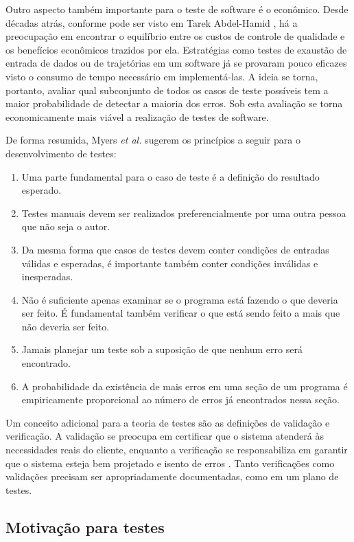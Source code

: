 Outro aspecto também importante para o teste de software é o econômico. Desde décadas atrás, conforme pode ser visto em Tarek Abdel-Hamid \cite{abdel}, há a preocupação em encontrar o equilíbrio entre os custos de controle de qualidade e os benefícios econômicos trazidos por ela. Estratégias como testes de exaustão de entrada de dados ou de trajetórias em um software já se provaram pouco eficazes visto o consumo de tempo necessário em implementá-las. A ideia se torna, portanto, avaliar qual subconjunto de todos os casos de teste possíveis tem a maior probabilidade de detectar a maioria dos erros. Sob esta avaliação se torna economicamente mais viável a realização de testes de software.

De forma resumida, Myers \emph{et al.} \cite{myers} sugerem os princípios a seguir para o desenvolvimento de testes:

\begin{enumerate}
    \item Uma parte fundamental para o caso de teste é a definição do resultado esperado.
    \item Testes manuais devem ser realizados preferencialmente por uma outra pessoa que não seja o autor.
    \item Da mesma forma que casos de testes devem conter condições de entradas válidas e esperadas, é importante também conter condições inválidas e inesperadas.
    \item Não é suficiente apenas examinar se o programa está fazendo o que deveria ser feito. É fundamental também verificar o que está sendo feito a mais que não deveria ser feito.
    \item Jamais planejar um teste sob a suposição de que nenhum erro será encontrado.
    \item A probabilidade da existência de mais erros em uma seção de um programa é empiricamente proporcional ao número de erros já encontrados nessa seção.
\end{enumerate}

Um conceito adicional para a teoria de testes são as definições de validação e verificação. A validação se preocupa em certificar que o sistema atenderá às necessidades reais do cliente, enquanto a verificação se responsabiliza em garantir que o sistema esteja bem projetado e isento de erros \cite{pham2003software}. Tanto verificações como validações precisam ser apropriadamente documentadas, como em um plano de testes.

\hypertarget{motivacao-para-testes}{%
\subsection{Motivação para testes}\label{motivacao-para-testes}}

